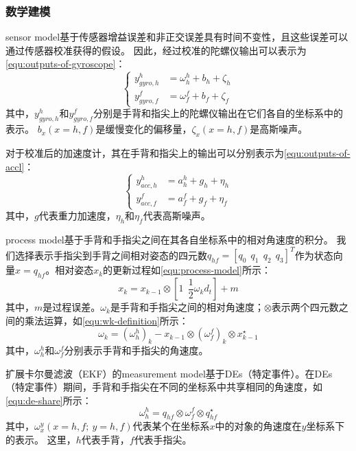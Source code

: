 \subsubsection{数学建模}
sensor model基于传感器增益误差和非正交误差具有时间不变性，且这些误差可以通过传感器校准获得的假设。
因此，经过校准的陀螺仪输出可以表示为\autoref{equ:outputs-of-gyroscope}：
\begin{equation}
    \label{equ:outputs-of-gyroscope}
    \begin{cases}
        y_{gyro,h}^h &= \omega_h^h + b_h + \zeta_h \\
        y_{gyro,f}^f &= \omega_f^f + b_f + \zeta_f
    \end{cases}
\end{equation}
其中，$y_{gyro,h}^h$和$y_{gyro,f}^f$分别是手背和指尖上的陀螺仪输出在它们各自的坐标系中的表示。
$b_x(x=h,f)$是缓慢变化的偏移量，$\zeta_x(x=h,f)$是高斯噪声。

对于校准后的加速度计，其在手背和指尖上的输出可以分别表示为\autoref{equ:outputs-of-accl}：
\begin{equation}
    \label{equ:outputs-of-accl}
    \begin{cases}
        y_{acc,h}^h &= a_h^h + g_h + \eta_h \\
        y_{acc,f}^f &= a_f^f + g_f + \eta_f
    \end{cases}
\end{equation}
其中，$g$代表重力加速度，$\eta_h$和$\eta_f$代表高斯噪声。

process model基于手背和手指尖之间在其各自坐标系中的相对角速度的积分。
我们选择表示手指尖到手背之间相对姿态的四元数$q_{hf} = [q_0\ \ q_1\ \ q_2\ \ q_3]^T$作为状态向量$x = q_{hf}$。相对姿态$x_k$的更新过程如\autoref{equ:process-model}所示：
\begin{equation}
    \label{equ:process-model}
    x_k = x_{k-1} \otimes [1\ \ \frac{1}{2}\omega_k d_t] + m
\end{equation}
其中，$m$是过程误差。$\omega_k$是手背和手指尖之间的相对角速度；$\otimes$表示两个四元数之间的乘法运算，如\autoref{equ:wk-definition}所示：
\begin{equation}
    \label{equ:wk-definition}
    \omega_k = (\omega_h^h)_k - x_{k-1} \otimes (\omega_f^f)_k \otimes x_{k-1}^{\star}
\end{equation}
其中，$\omega_h^h$和$\omega_f^f$分别表示手背和手指尖的角速度。

扩展卡尔曼滤波（EKF）的measurement model基于DEs（特定事件）。在DEs（特定事件）期间，手背和手指尖在不同的坐标系中共享相同的角速度，如\autoref{equ:de-share}所示：
\begin{equation}
    \label{equ:de-share}
    \omega_h^h = q_{hf} \otimes \omega_f^f \otimes q_{hf}^{\star}
\end{equation}
其中，$\omega_x^y(x=h,f;\ y=h,f)$代表某个在坐标系$x$中的对象的角速度在$y$坐标系下的表示。
这里，$h$代表手背，$f$代表手指尖。

